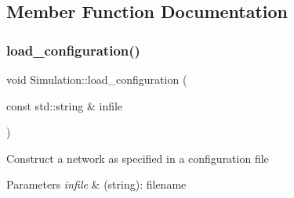 \subsection{Member Function Documentation}
\mbox{\label{classSimulation_acd6ce915b07465d9aaaa5fdcbb5ae077}} 
\subsubsection{\texorpdfstring{load\+\_\+configuration()}{load\_configuration()}}
{\footnotesize\ttfamily void Simulation\+::load\+\_\+configuration (\begin{DoxyParamCaption}\item[{const std\+::string \&}]{infile }\end{DoxyParamCaption})}

Construct a network as specified in a configuration file 
\begin{DoxyParams}{Parameters}
{\em infile} & (string)\+: filename \\
\hline
\end{DoxyParams}

